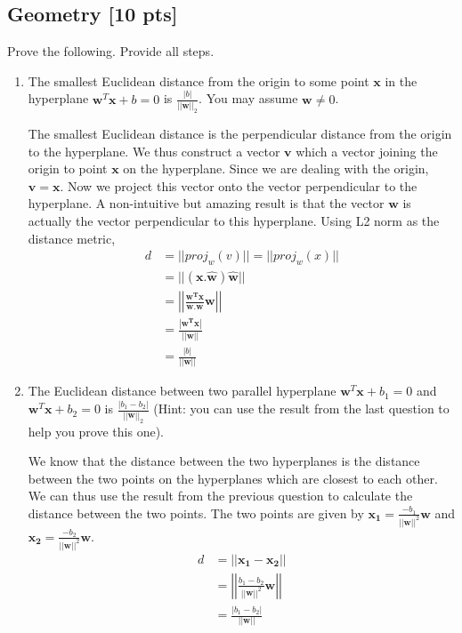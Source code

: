 \documentclass[a4paper]{article}
\theoremstyle{definition}
\newenvironment{soln}{
	\leavevmode\color{blue}\ignorespaces
}{}
\begin{document}
	\subsection{Geometry [10 pts]}
	Prove the following.  Provide all steps.
	\begin{enumerate}
		\item 	The smallest Euclidean distance from the origin to some point $\mathbf{x}$ in the hyperplane $\mathbf{w}^{T}\mathbf{x} + b = 0$ is $\frac{|b|}{||\mathbf{w}||_2}$.  You may assume $\mathbf{w} \neq 0$.\\
		\begin{soln}
		The smallest Euclidean distance is the perpendicular distance from the origin to the hyperplane. We thus construct a vector $\mathbf{v}$ which a vector joining the origin to point $\mathbf{x}$ on the hyperplane. Since we are dealing with the origin, $\mathbf{v} = \mathbf{x}$. Now we project this vector onto the vector perpendicular to the hyperplane. A non-intuitive but amazing result is that the vector $\mathbf{w}$ is actually the vector perpendicular to this hyperplane. Using L2 norm as the distance metric,
		\begin{align*}
			d &= ||proj_w(v)|| =  ||proj_w(x)|| \\
			  &= ||(\mathbf{x}.\mathbf{\hat{w}})\mathbf{\hat{w}}|| \\
			  &= \left|\left|\frac{\mathbf{w^T}\mathbf{x}}{\mathbf{w}.\mathbf{w}}\mathbf{w}\right|\right| \\
			  &= \frac{|\mathbf{w^T}\mathbf{x}|}{||\mathbf{w}||} \\
			  &= \frac{|b|}{||\mathbf{w}||}
		\end{align*}
		\end{soln}
		
		\item 	The Euclidean distance between two parallel hyperplane $\mathbf{w}^{T}\mathbf{x} + b_1 = 0$ and $\mathbf{w}^{T}\mathbf{x} + b_2 = 0$ is $\frac{|b_1 - b_2|}{||\mathbf{w}||_2}$ (Hint: you can use the result from the last question to help you prove this one).
		
		\begin{soln}
			We know that the distance between the two hyperplanes is the distance between the two points on the hyperplanes which are closest to each other. We can thus use the result from the previous question to calculate the distance between the two points. The two points are given by $\mathbf{x_1} = \frac{-b_1}{||\mathbf{w}||^2}\mathbf{w}$ and $\mathbf{x_2} = \frac{-b_2}{||\mathbf{w}||^2}\mathbf{w}$. 
			\begin{align*}
				d &= ||\mathbf{x_1} - \mathbf{x_2}|| \\
				  &= \left|\left|\frac{b_1 - b_2}{||\mathbf{w}||^2}\mathbf{w}\right|\right| \\
				  &= \frac{|b_1 - b_2|}{||\mathbf{w}||}
			\end{align*}
		\end{soln}
		
	\end{enumerate}
	
\end{document}
